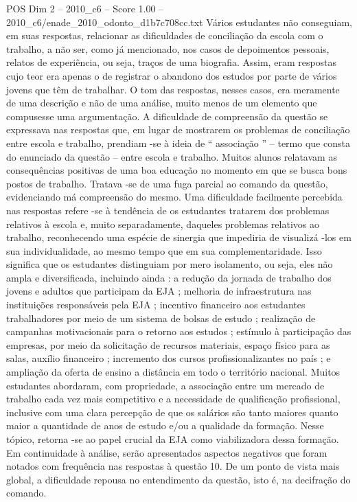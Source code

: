 \begin{textsample}{POS Dim 2 – 2010\_c6 – Score 1.00 – 2010\_c6/enade\_2010\_odonto\_d1b7c708cc.txt}
Vários estudantes não conseguiam, em suas respostas, relacionar as dificuldades de conciliação da escola com o trabalho, a não ser, como já mencionado, nos casos de depoimentos pessoais, relatos de experiência, ou seja, traços de uma biografia.
Assim, eram respostas cujo teor era apenas o de registrar o abandono dos estudos por parte de vários jovens que têm de trabalhar.
O tom das respostas, nesses casos, era meramente de uma descrição e não de uma análise, muito menos de um elemento que compusesse uma argumentação.
A dificuldade de compreensão da questão se expressava nas respostas que, em lugar de mostrarem os problemas de conciliação entre escola e trabalho, prendiam -se à ideia de “ associação ” – termo que consta do enunciado da questão – entre escola e trabalho.
Muitos alunos relatavam as consequências positivas de uma boa educação no momento em que se busca bons postos de trabalho.
Tratava -se de uma fuga parcial ao comando da questão, evidenciando má compreensão do mesmo.
Uma dificuldade facilmente percebida nas respostas refere -se à tendência de os estudantes tratarem dos problemas relativos à escola e, muito separadamente, daqueles problemas relativos ao trabalho, reconhecendo uma espécie de sinergia que impediria de visualizá -los em sua individualidade, ao mesmo tempo que em sua complementaridade.
Isso significa que os estudantes distinguiam por mero isolamento, ou seja, eles não ampla e diversificada, incluindo ainda : a redução da jornada de trabalho dos jovens e adultos que participam da EJA ; melhoria de infraestrutura nas instituições responsáveis pela EJA ; incentivo financeiro aos estudantes trabalhadores por meio de um sistema de bolsas de estudo ; realização de campanhas motivacionais para o retorno aos estudos ; estímulo à participação das empresas, por meio da solicitação de recursos materiais, espaço físico para as salas, auxílio financeiro ; incremento dos cursos profissionalizantes no país ; e ampliação da oferta de ensino a distância em todo o território nacional.
Muitos estudantes abordaram, com propriedade, a associação entre um mercado de trabalho cada vez mais competitivo e a necessidade de qualificação profissional, inclusive com uma clara percepção de que os salários são tanto maiores quanto maior a quantidade de anos de estudo e/ou a qualidade da formação.
Nesse tópico, retorna -se ao papel crucial da EJA como viabilizadora dessa formação.
Em continuidade à análise, serão apresentados aspectos negativos que foram notados com frequência nas respostas à questão 10.
De um ponto de vista mais global, a dificuldade repousa no entendimento da questão, isto é, na decifração do comando.

\end{textsample}
